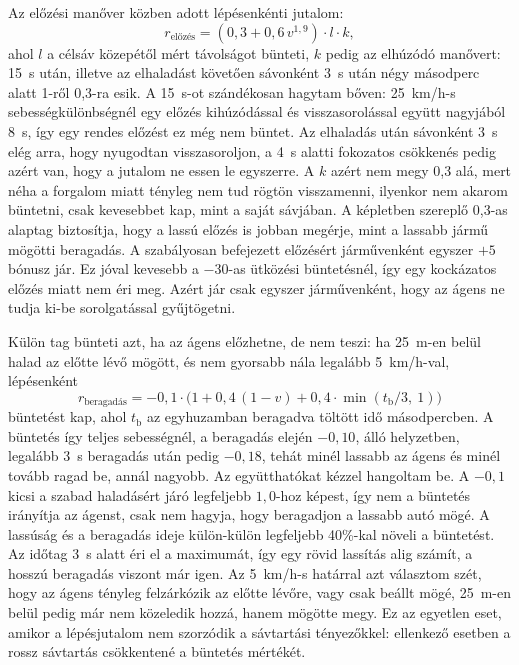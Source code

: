 \documentclass[a4paper,12pt,oneside]{article}
\begin{document}
Az előzési manőver közben adott lépésenkénti jutalom:
\begin{equation}
  r_{\text{előzés}} = (0{,}3 + 0{,}6\,v^{1,9}) \cdot l \cdot k,
  \label{eq:r1_overtake}
\end{equation}
ahol $l$ a célsáv közepétől mért távolságot bünteti, $k$ pedig az elhúzódó manővert:
15~s után, illetve az elhaladást követően sávonként 3~s után négy másodperc alatt
1-ről 0,3-ra esik. A 15~s-ot szándékosan hagytam bőven: 25~km/h-s sebességkülönbségnél egy
előzés kihúzódással és visszasorolással együtt nagyjából 8~s, így egy rendes előzést ez még nem
büntet. Az elhaladás után sávonként 3~s elég arra, hogy nyugodtan visszasoroljon, a 4~s alatti
fokozatos csökkenés pedig azért van, hogy a jutalom ne essen le egyszerre. A $k$ azért nem megy
0,3 alá, mert néha a forgalom miatt tényleg nem tud rögtön visszamenni, ilyenkor nem akarom
büntetni, csak kevesebbet kap, mint a saját sávjában.
A képletben szereplő 0,3-as alaptag biztosítja, hogy a lassú előzés is jobban
megérje, mint a lassabb jármű mögötti beragadás. A szabályosan befejezett előzésért
járművenként egyszer $+5$ bónusz jár. Ez jóval kevesebb a $-30$-as ütközési
büntetésnél, így egy kockázatos előzés miatt nem éri meg. Azért jár csak egyszer
járművenként, hogy az ágens ne tudja ki-be sorolgatással gyűjtögetni.

Külön tag bünteti azt, ha az ágens előzhetne, de nem teszi: ha 25~m-en belül halad az
előtte lévő mögött, és nem gyorsabb nála legalább 5~km/h-val, lépésenként
\begin{equation}
  r_{\text{beragadás}} = -0{,}1 \cdot \bigl(1 + 0{,}4\,(1 - v) + 0{,}4 \cdot \min(t_{\text{b}}/3,\ 1)\bigr)
  \label{eq:r1_lag}
\end{equation}
büntetést kap, ahol $t_{\text{b}}$ az egyhuzamban beragadva töltött idő másodpercben.
A büntetés így teljes sebességnél, a beragadás elején $-0{,}10$, álló helyzetben,
legalább 3~s beragadás után pedig $-0{,}18$, tehát minél lassabb az ágens és minél tovább ragad be, annál
nagyobb. Az együtthatókat kézzel hangoltam be. A $-0{,}1$ kicsi a szabad haladásért járó
legfeljebb $1{,}0$-hoz képest, így nem a büntetés irányítja az ágenst, csak nem hagyja, hogy
beragadjon a lassabb autó mögé. A lassúság és a beragadás ideje külön-külön legfeljebb
40\%-kal növeli a büntetést. Az időtag 3~s alatt éri el a maximumát, így egy rövid lassítás
alig számít, a hosszú beragadás viszont már igen. Az 5~km/h-s határral azt választom szét, hogy
az ágens tényleg felzárkózik az előtte lévőre, vagy csak beállt mögé, 25~m-en belül pedig már
nem közeledik hozzá, hanem mögötte megy.
Ez az egyetlen eset, amikor
a lépésjutalom nem szorzódik a sávtartási tényezőkkel: ellenkező esetben a rossz
sávtartás csökkentené a büntetés mértékét.
\end{document}
